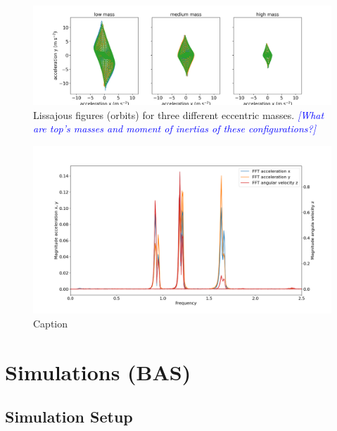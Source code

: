 \documentclass{article}
\newcommand{\andy}[1]{\textcolor{blue}{\emph{#1}}}
\begin{document}
\begin{figure}
    \centering
    \includegraphics[width=\linewidth]{results/experiment/lissajous.png}
    \caption{Lissajous figures (orbits) for three different eccentric masses. \andy{[What are top's masses and moment of inertias of these configurations?]}}
    \label{fig:lissajous}
\end{figure}

\begin{figure}
    \centering
    \includegraphics[width=\linewidth]{results/experiment/spectrum.png}
    \caption{Caption}
    \label{fig:spectrum}
\end{figure}

\clearpage

\section{Simulations (BAS)}
\label{sec:simulations}

\subsection{Simulation Setup}
\end{document}
